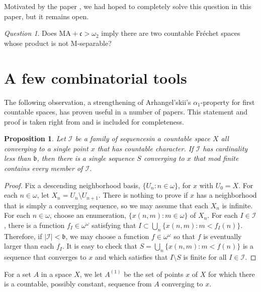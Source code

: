 \documentclass{amsart}
\newtheorem{proposition}[thm]{Proposition}
\theoremstyle{definition}
\theoremstyle{remark}
\newtheorem{question}{Question}
\begin{document}
Motivated by the  paper \cite{Dow2025},
we had hoped to completely solve this  question in this paper,
but it remains open.

\begin{question}  Does $\mbox{MA} + \mathfrak c>\omega_2$ imply
there are two countable Fr\'echet spaces whose product
is not M-separable?
\end{question}

\section{A few combinatorial tools}


 The following observation, a strengthening of
  Arhangel'skii's $\alpha_1$-property for first countable
  spaces, has proven useful in a number of papers. This statement and proof
  is taken right from \cite{MA3} and is included
  for completeness.

  \begin{proposition} Let $\mathcal I$ be a family
  of sequences\label{alpha1} in a countable space $X$ all converging
  to a single point $x$ that has countable character.
  If $\mathcal I$ has cardinality less than $\mathfrak b$,
   then there is a single sequence $S$ converging to
    $x$ that mod finite contains every member of $\mathcal I$.
  \end{proposition}

\begin{proof} Fix a  descending neighborhood
basis, $\{U_n : n \in\omega\}$, for $x$
with $U_0=X$. For each
 $n\in\omega$, let $X_n = U_n\setminus U_{n+1}$.
 There is nothing to prove if $x$ has a neighborhood
 that is simply a converging sequence, so
  we may assume that each $X_n$ is infinite.
For each $n\in\omega$,
 choose an  enumeration, $\{ x(n,m) : m\in \omega\}$
 of $X_n$. For each $I\in\mathcal I$, there is a
 function $f_I\in \omega^\omega$ satisfying
 that $I \subset \bigcup_n   \{ x(n,m) : m<f_I(n)\}$. 
 Therefore, if $|\mathcal I|<\mathfrak b$, we may
 choose a function $f\in\omega^\omega$ so that
  $f$ is eventually larger than each $f_I$. 
  It is easy to check that $S =\bigcup_n
   \{ x(n,m) : m< f(n)\}$ is a sequence
   that converges to $x$ 
   and which satisfies that $I\setminus S$
   is finite for all $I\in \mathcal I$.
\end{proof}

For a set $A$ in a space $X$, we let
 $A^{(1)} $ be the set of points $x$ of $X$ for which
 there is a countable, possibly constant,
 sequence from $A$ converging to $x$.
\end{document}
